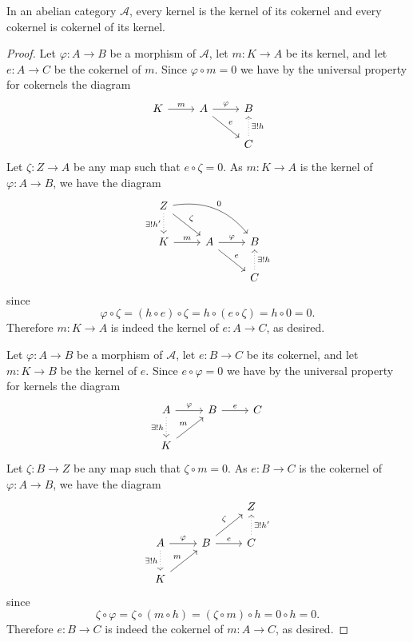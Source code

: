 \documentclass[10pt]{amsart}
\begin{document}
\begin{lem}\label{lem4}
  In an abelian category $\mathcal{A}$, every kernel is the kernel of its cokernel and every cokernel is cokernel of its kernel.

  \begin{proof}
    Let $\varphi : A \rightarrow B$ be a morphism of $\mathcal{A}$, let $m : K \rightarrow A$ be its kernel, and let $e : A \rightarrow C$ be the cokernel of $m$.
    Since $\varphi \circ m = 0$ we have by the universal property for cokernels the diagram
    $$\begin{tikzcd}
      K \arrow{r}{m} &A \arrow{r}{\varphi} \arrow{rd}{e} & B\\
      & & C\arrow[swap,dotted]{u}{\exists ! h}
    \end{tikzcd}$$
    Let $\zeta : Z \rightarrow A$ be any map such that $e \circ \zeta = 0$.
    As $m : K \rightarrow A$ is the kernel of $\varphi : A \rightarrow B$, we have the diagram
    $$\begin{tikzcd}
      Z \arrow{rd}{\zeta} \arrow[swap, dotted]{d}{\exists !h^\prime}\arrow[bend left]{rrd}{0}\\
      K \arrow{r}{m} & A\arrow{r}{\varphi} \arrow{rd}{e}& B\\
      & & C \arrow[dotted,swap]{u}{\exists ! h}
    \end{tikzcd}$$
    since 
    $$\varphi \circ \zeta = (h \circ e) \circ \zeta = h \circ (e \circ \zeta) = h \circ 0 = 0.$$
    Therefore $m : K \rightarrow A$ is indeed the kernel of $e : A \rightarrow C$, as desired.

    Let $\varphi : A \rightarrow B$ be a morphism of $\mathcal{A}$, let $e : B \rightarrow C$ be its cokernel, and let $m : K \rightarrow B$ be the kernel of $e$.
    Since $e \circ \varphi = 0$ we have by the universal property for kernels the diagram
    $$\begin{tikzcd}
      A \arrow{r}{\varphi}\arrow[dotted,swap]{d}{\exists ! h} & B \arrow{r}{e} & C\\
      K \arrow{ur}{m}
    \end{tikzcd}$$
    Let $\zeta : B \rightarrow Z$ be any map such that $\zeta \circ m = 0$.
    As $e : B \rightarrow C$ is the cokernel of $\varphi : A \rightarrow B$, we have the diagram
    $$\begin{tikzcd}
      & & Z\\
      A \arrow{r}{\varphi}\arrow[dotted,swap]{d}{\exists ! h} & B \arrow{r}{e}\arrow{ru}{\zeta} & C \arrow[dotted,swap]{u}{\exists ! h^\prime}\\
      K \arrow{ur}{m} & & 
    \end{tikzcd}$$
    since 
    $$\zeta \circ \varphi = \zeta \circ (m \circ h) = (\zeta \circ m) \circ h = 0 \circ h = 0.$$
    Therefore $e : B \rightarrow C$ is indeed the cokernel of $m : A \rightarrow C$, as desired.
  \end{proof}
\end{lem}
\end{document}
